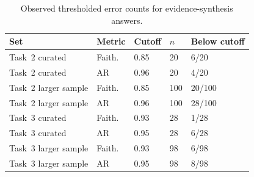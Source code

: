 \begin{table}
\centering
\scriptsize
\caption{Observed thresholded error counts for evidence-synthesis answers.}
\label{tab:error-rate-diagnostics}
\setlength{\tabcolsep}{2pt}
\renewcommand{\arraystretch}{1.02}
\begin{tabular}{P{3.0cm} Q{1.2cm} Q{1.1cm} Q{0.8cm} Q{1.8cm}}
\toprule
\textbf{Set} & \textbf{Metric} & \textbf{Cutoff} & \textbf{$n$} & \textbf{Below cutoff} \\
\midrule
Task~2 curated & Faith. & 0.85 & 20 & 6/20 \\
Task~2 curated & AR & 0.96 & 20 & 4/20 \\
Task~2 larger sample & Faith. & 0.85 & 100 & 20/100 \\
Task~2 larger sample & AR & 0.96 & 100 & 28/100 \\
Task~3 curated & Faith. & 0.93 & 28 & 1/28 \\
Task~3 curated & AR & 0.95 & 28 & 6/28 \\
Task~3 larger sample & Faith. & 0.93 & 98 & 6/98 \\
Task~3 larger sample & AR & 0.95 & 98 & 8/98 \\
\bottomrule
\end{tabular}
\end{table}
